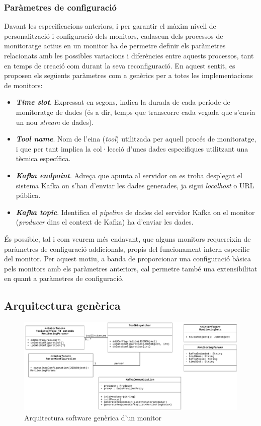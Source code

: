 \subsubsection{Paràmetres de configuració}

Davant les especificacions anteriors, i per garantir el màxim nivell de personalització i configuració dels monitors, cadascun dels processos de monitoratge actius en un monitor ha de permetre definir els paràmetres relacionats amb les possibles variacions i diferències entre aquests processos, tant en temps de creació com durant la seva reconfiguració. En aquest sentit, es proposen els següents paràmetres com a genèrics per a totes les implementacions de monitors:

\begin{itemize}
\item \textbf{\textit{Time slot}}. Expressat en segons, indica la durada de cada període de monitoratge de dades (és a dir, temps que transcorre cada vegada que s'envia un nou \textit{stream} de dades).
\item \textbf{\textit{Tool name}}. Nom de l'eina (\textit{tool}) utilitzada per aquell procés de monitoratge, i que per tant implica la col·lecció d'unes dades específiques utilitzant una tècnica específica.
\item \textbf{\textit{Kafka endpoint}}. Adreça que apunta al servidor on es troba desplegat el sistema Kafka on s'han d'enviar les dades generades, ja sigui \textit{localhost} o URL pública.
\item \textbf{\textit{Kafka topic}}. Identifica el \textit{pipeline} de dades del servidor Kafka on el monitor (\textit{producer} dins el context de Kafka) ha d'enviar les dades.
\end{itemize}

És possible, tal i com veurem més endavant, que alguns monitors requereixin de paràmetres de configuració addicionals, propis del funcionament intern específic del monitor. Per aquest motiu, a banda de proporcionar una configuració bàsica pels monitors amb els paràmetres anteriors, cal permetre també una extensibilitat en quant a paràmetres de configuració.

\subsection{Arquitectura genèrica}

\begin{figure}
\centering
\includegraphics[width=14cm]{Figures/Figure5}
\decoRule
\caption[Arquitectura software genèrica d'un monitor]{Arquitectura software genèrica d'un monitor}
\label{fig:Figura5}
\end{figure}

